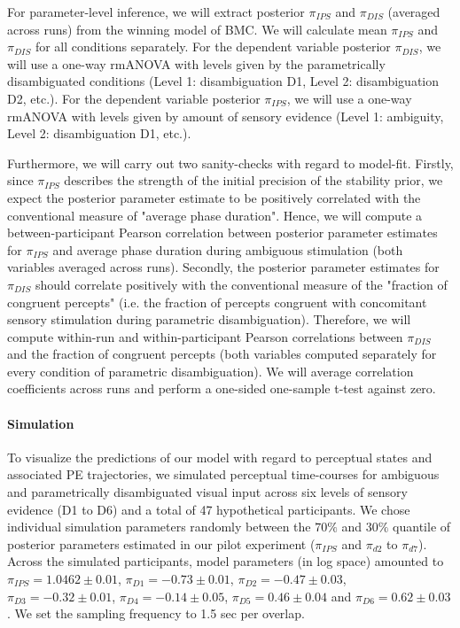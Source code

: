 \documentclass[12pt]{article}
\begin{document}
For parameter-level inference, we will extract posterior $\pi_{IPS}$ and $\pi_{DIS}$ (averaged across runs) from the winning model of BMC. We will calculate mean $\pi_{IPS}$ and $\pi_{DIS}$ for all conditions separately. For the dependent variable posterior $\pi_{DIS}$, we will use a one-way rmANOVA with levels given by the parametrically disambiguated conditions (Level 1: disambiguation D1, Level 2: disambiguation D2, etc.). For the dependent variable posterior $\pi_{IPS}$, we will use a one-way rmANOVA with levels given by amount of sensory evidence (Level 1: ambiguity, Level 2: disambiguation D1, etc.).

Furthermore, we will carry out two sanity-checks with regard to model-fit. Firstly, since $\pi_{IPS}$ describes the strength of the initial precision of the stability prior, we expect the posterior parameter estimate to be positively correlated with the conventional measure of "average phase duration". Hence, we will compute a between-participant Pearson correlation between posterior parameter estimates for $\pi_{IPS}$ and average phase duration during ambiguous stimulation (both variables averaged across runs). Secondly, the posterior parameter estimates for $\pi_{DIS}$ should correlate positively with the conventional measure of the "fraction of congruent percepts" (i.e. the fraction of percepts congruent with concomitant sensory stimulation during parametric disambiguation). Therefore, we will compute within-run and within-participant Pearson correlations between $\pi_{DIS}$ and the fraction of congruent percepts (both variables computed separately for every condition of parametric disambiguation). We will average correlation coefficients across runs and perform a one-sided one-sample t-test against zero. 

\paragraph{Simulation}

To visualize the predictions of our model with regard to perceptual states and associated PE trajectories, we simulated perceptual time-courses for ambiguous and parametrically disambiguated visual input across six levels of sensory evidence (D1 to D6) and a total of 47 hypothetical participants. We chose individual simulation parameters randomly between the $70\%$ and $30\%$ quantile of posterior parameters estimated in our pilot experiment ($\pi_{IPS}$ and $\pi_{d2}$ to $\pi_{d7}$). Across the simulated participants, model parameters (in log space) amounted to $\pi_{IPS} = 1.0462 \pm 0.01$, $\pi_{D1} = -0.73 \pm 0.01$, $\pi_ {D2} = -0.47 \pm 0.03$, $\pi_ {D3} = -0.32 \pm 0.01$, $\pi_ {D4} = -0.14 \pm 0.05$, $\pi_ {D5} = 0.46 \pm 0.04$ and $\pi_ {D6} = 0.62 \pm 0.03$. We set the sampling frequency to 1.5 sec per overlap. 
\end{document}
